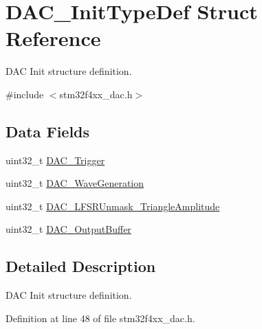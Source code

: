 \hypertarget{struct_d_a_c___init_type_def}{\section{D\-A\-C\-\_\-\-Init\-Type\-Def Struct Reference}
\label{struct_d_a_c___init_type_def}
}


D\-A\-C Init structure definition.  




{\ttfamily \#include $<$stm32f4xx\-\_\-dac.\-h$>$}

\subsection*{Data Fields}
\begin{DoxyCompactItemize}
\item 
uint32\-\_\-t \hyperlink{struct_d_a_c___init_type_def_ae1edfee233aee962b357cbc3994b330b}{D\-A\-C\-\_\-\-Trigger}
\item 
uint32\-\_\-t \hyperlink{struct_d_a_c___init_type_def_a3dfc2e2197154ed20469e57ccff591d3}{D\-A\-C\-\_\-\-Wave\-Generation}
\item 
uint32\-\_\-t \hyperlink{struct_d_a_c___init_type_def_aff0a3e0149873939ded70bc466c85dc2}{D\-A\-C\-\_\-\-L\-F\-S\-R\-Unmask\-\_\-\-Triangle\-Amplitude}
\item 
uint32\-\_\-t \hyperlink{struct_d_a_c___init_type_def_a22d062287d8cbba2342585ea7944f61d}{D\-A\-C\-\_\-\-Output\-Buffer}
\end{DoxyCompactItemize}


\subsection{Detailed Description}
D\-A\-C Init structure definition. 

Definition at line 48 of file stm32f4xx\-\_\-dac.\-h.



